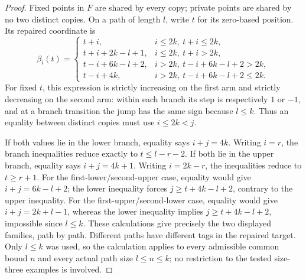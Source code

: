 \begin{proof}
Fixed points in $F$ are shared by every copy; private points are shared
by no two distinct copies. On a path of length $l$, write $t$ for its
zero-based position. Its repaired coordinate is
\[
 \beta_i(t)=
 \begin{cases}
 t+i,&i\leq2k,\ t+i\leq2k,\\
 t+i+2k-l+1,&i\leq2k,\ t+i>2k,\\
 t-i+6k-l+2,&i>2k,\ t-i+6k-l+2>2k,\\
 t-i+4k,&i>2k,\ t-i+6k-l+2\leq2k.
 \end{cases}
\]
For fixed $t$, this expression is strictly increasing on the first
arm and strictly decreasing on the second arm: within each branch its
step is respectively $1$ or $-1$, and at a branch transition the jump
has the same sign because $l\leq k$. Thus an equality between distinct
copies must use $i\leq2k<j$.

If both values lie in the lower branch, equality says $i+j=4k$.
Writing $i=r$, the branch inequalities reduce exactly to
$t\leq l-r-2$. If both lie in the upper branch, equality says
$i+j=4k+1$. Writing $i=2k-r$, the inequalities reduce to $t\geq r+1$.
For the first-lower/second-upper case, equality would give
$i+j=6k-l+2$; the lower inequality forces
$j\geq t+4k-l+2$, contrary to the upper inequality. For the
first-upper/second-lower case, equality would give
$i+j=2k+l-1$, whereas the lower inequality implies
$j\geq t+4k-l+2$, impossible since $l\leq k$.
These calculations give precisely the two displayed families, path by
path. Different paths have different tags in the repaired target.
Only $l\leq k$ was used, so the calculation applies to every admissible
common bound $n$ and every actual path size $l\leq n\leq k$; no
restriction to the tested size-three examples is involved.
\end{proof}

